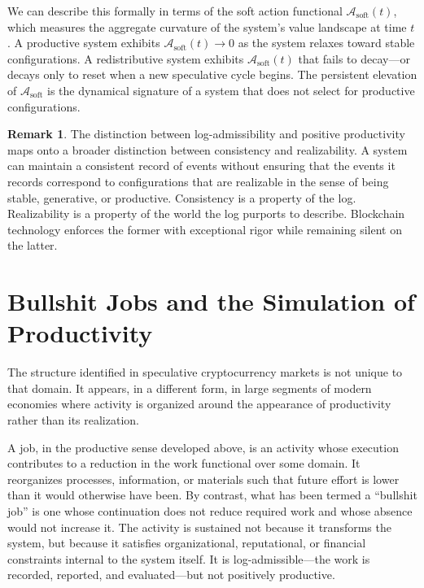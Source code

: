 \documentclass[12pt, oneside]{article}
\theoremstyle{definition}
\newtheorem{remark}{Remark}[section]
\newcommand{\Asoft}{\mathcal{A}_{\mathrm{soft}}}
\begin{document}
We can describe this formally in terms of the soft action functional $\Asoft(t)$, which measures the aggregate curvature of the system's value landscape at time $t$. A productive system exhibits $\Asoft(t) \to 0$ as the system relaxes toward stable configurations. A redistributive system exhibits $\Asoft(t)$ that fails to decay---or decays only to reset when a new speculative cycle begins. The persistent elevation of $\Asoft$ is the dynamical signature of a system that does not select for productive configurations.

\begin{remark}
The distinction between log-admissibility and positive productivity maps onto a broader distinction between consistency and realizability. A system can maintain a consistent record of events without ensuring that the events it records correspond to configurations that are realizable in the sense of being stable, generative, or productive. Consistency is a property of the log. Realizability is a property of the world the log purports to describe. Blockchain technology enforces the former with exceptional rigor while remaining silent on the latter.
\end{remark}

\section{Bullshit Jobs and the Simulation of Productivity}

The structure identified in speculative cryptocurrency markets is not unique to that domain. It appears, in a different form, in large segments of modern economies where activity is organized around the appearance of productivity rather than its realization.

A job, in the productive sense developed above, is an activity whose execution contributes to a reduction in the work functional over some domain. It reorganizes processes, information, or materials such that future effort is lower than it would otherwise have been. By contrast, what has been termed a ``bullshit job'' is one whose continuation does not reduce required work and whose absence would not increase it. The activity is sustained not because it transforms the system, but because it satisfies organizational, reputational, or financial constraints internal to the system itself. It is log-admissible---the work is recorded, reported, and evaluated---but not positively productive.
\end{document}
